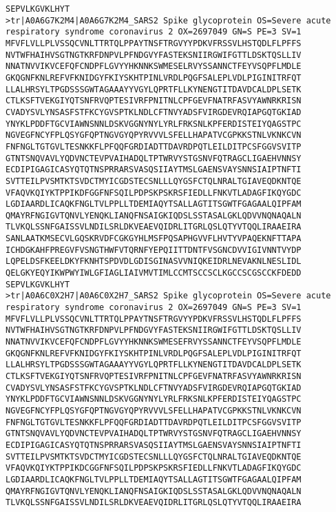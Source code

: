 \begin{lstlisting}
SEPVLKGVKLHYT
>tr|A0A6G7K2M4|A0A6G7K2M4_SARS2 Spike glycoprotein OS=Severe acute respiratory syndrome coronavirus 2 OX=2697049 GN=S PE=3 SV=1
MFVFLVLLPLVSSQCVNLTTRTQLPPAYTNSFTRGVYYPDKVFRSSVLHSTQDLFLPFFS
NVTWFHAIHVSGTNGTKRFDNPVLPFNDGVYFASTEKSNIIRGWIFGTTLDSKTQSLLIV
NNATNVVIKVCEFQFCNDPFLGVYYHKNNKSWMESELRVYSSANNCTFEYVSQPFLMDLE
GKQGNFKNLREFVFKNIDGYFKIYSKHTPINLVRDLPQGFSALEPLVDLPIGINITRFQT
LLALHRSYLTPGDSSSGWTAGAAAYYVGYLQPRTFLLKYNENGTITDAVDCALDPLSETK
CTLKSFTVEKGIYQTSNFRVQPTESIVRFPNITNLCPFGEVFNATRFASVYAWNRKRISN
CVADYSVLYNSASFSTFKCYGVSPTKLNDLCFTNVYADSFVIRGDEVRQIAPGQTGKIAD
YNYKLPDDFTGCVIAWNSNNLDSKVGGNYNYLYRLFRKSNLKPFERDISTEIYQAGSTPC
NGVEGFNCYFPLQSYGFQPTNGVGYQPYRVVVLSFELLHAPATVCGPKKSTNLVKNKCVN
FNFNGLTGTGVLTESNKKFLPFQQFGRDIADTTDAVRDPQTLEILDITPCSFGGVSVITP
GTNTSNQVAVLYQDVNCTEVPVAIHADQLTPTWRVYSTGSNVFQTRAGCLIGAEHVNNSY
ECDIPIGAGICASYQTQTNSPRRARSVASQSIIAYTMSLGAENSVAYSNNSIAIPTNFTI
SVTTEILPVSMTKTSVDCTMYICGDSTECSNLLLQYGSFCTQLNRALTGIAVEQDKNTQE
VFAQVKQIYKTPPIKDFGGFNFSQILPDPSKPSKRSFIEDLLFNKVTLADAGFIKQYGDC
LGDIAARDLICAQKFNGLTVLPPLLTDEMIAQYTSALLAGTITSGWTFGAGAALQIPFAM
QMAYRFNGIGVTQNVLYENQKLIANQFNSAIGKIQDSLSSTASALGKLQDVVNQNAQALN
TLVKQLSSNFGAISSVLNDILSRLDKVEAEVQIDRLITGRLQSLQTYVTQQLIRAAEIRA
SANLAATKMSECVLGQSKRVDFCGKGYHLMSFPQSAPHGVVFLHVTYVPAQEKNFTTAPA
ICHDGKAHFPREGVFVSNGTHWFVTQRNFYEPQIITTDNTFVSGNCDVVIGIVNNTVYDP
LQPELDSFKEELDKYFKNHTSPDVDLGDISGINASVVNIQKEIDRLNEVAKNLNESLIDL
QELGKYEQYIKWPWYIWLGFIAGLIAIVMVTIMLCCMTSCCSCLKGCCSCGSCCKFDEDD
SEPVLKGVKLHYT
>tr|A0A6C0X2H7|A0A6C0X2H7_SARS2 Spike glycoprotein OS=Severe acute respiratory syndrome coronavirus 2 OX=2697049 GN=S PE=3 SV=1
MFVFLVLLPLVSSQCVNLTTRTQLPPAYTNSFTRGVYYPDKVFRSSVLHSTQDLFLPFFS
NVTWFHAIHVSGTNGTKRFDNPVLPFNDGVYFASTEKSNIIRGWIFGTTLDSKTQSLLIV
NNATNVVIKVCEFQFCNDPFLGVYYHKNNKSWMESEFRVYSSANNCTFEYVSQPFLMDLE
GKQGNFKNLREFVFKNIDGYFKIYSKHTPINLVRDLPQGFSALEPLVDLPIGINITRFQT
LLALHRSYLTPGDSSSGWTAGAAAYYVGYLQPRTFLLKYNENGTITDAVDCALDPLSETK
CTLKSFTVEKGIYQTSNFRVQPTESIVRFPNITNLCPFGEVFNATRFASVYAWNRKRISN
CVADYSVLYNSASFSTFKCYGVSPTKLNDLCFTNVYADSFVIRGDEVRQIAPGQTGKIAD
YNYKLPDDFTGCVIAWNSNNLDSKVGGNYNYLYRLFRKSNLKPFERDISTEIYQAGSTPC
NGVEGFNCYFPLQSYGFQPTNGVGYQPYRVVVLSFELLHAPATVCGPKKSTNLVKNKCVN
FNFNGLTGTGVLTESNKKFLPFQQFGRDIADTTDAVRDPQTLEILDITPCSFGGVSVITP
GTNTSNQVAVLYQDVNCTEVPVAIHADQLTPTWRVYSTGSNVFQTRAGCLIGAEHVNNSY
ECDIPIGAGICASYQTQTNSPRRARSVASQSIIAYTMSLGAENSVAYSNNSIAIPTNFTI
SVTTEILPVSMTKTSVDCTMYICGDSTECSNLLLQYGSFCTQLNRALTGIAVEQDKNTQE
VFAQVKQIYKTPPIKDCGGFNFSQILPDPSKPSKRSFIEDLLFNKVTLADAGFIKQYGDC
LGDIAARDLICAQKFNGLTVLPPLLTDEMIAQYTSALLAGTITSGWTFGAGAALQIPFAM
QMAYRFNGIGVTQNVLYENQKLIANQFNSAIGKIQDSLSSTASALGKLQDVVNQNAQALN
TLVKQLSSNFGAISSVLNDILSRLDKVEAEVQIDRLITGRLQSLQTYVTQQLIRAAEIRA

\end{lstlisting}
